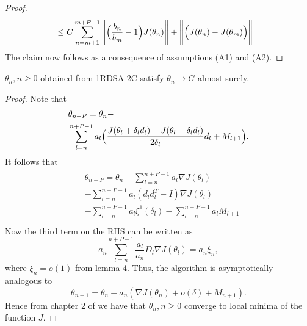 \begin{lemma}
\begin{proof}
\begin{align*}
  &\leq C \sum_{n=m+1}^{m+P-1}\Bigg{\|}\Big{(}\frac{b_n}{b_m}-1\Big{)} J(\theta_n)\Bigg{\|}
  +\Bigg{\|}\Big{(} J(\theta_n)- J(\theta_{m})\Big{)}\Bigg{\|}
\end{align*}
The claim now follows as a consequence of assumptions (A1) and (A2).
\end{proof}
\begin{theorem}
 $\theta_n, n\geq0$ obtained from 1RDSA-2C satisfy $\theta_n \rightarrow G$
 almost surely.
\end{theorem}
\begin{proof}
 Note that
 \begin{align*}
  \begin{split}
  & \theta_{n+P} = \theta_n- \\ 
  &\sum_{l=n}^{n+P-1}a_l\Big{(}\frac{J(\theta_l+\delta_l d_l)-J(\theta_l-\delta_l d_l)}{2\delta_l}d_l+M_{l+1}\Big{)}.
 \end{split}
 \end{align*}
It follows that
 \begin{align*}
  \begin{split}
  & \theta_{n+P} = \theta_n- \sum_{l=n}^{n+P-1}a_l\nabla J(\theta_l)\\ 
  & -\sum_{l=n}^{n+P-1}a_l(d_ld_l^T-I)\nabla J(\theta_l)\\
  & -\sum_{l=n}^{n+P-1}a_l \xi^{1}(\delta_l)-\sum_{l=n}^{n+P-1}a_lM_{l+1}\\
  \end{split}
 \end{align*}
Now the third term on the RHS can be written as
$$a_n\sum_{l=n}^{n+P-1}\frac{a_l}{a_n}D_{l}\nabla J(\theta_l)=a_n\xi_{n},$$
where $\xi_{n}=o(1)$ from lemma 4.
Thus, the algorithm is asymptotically analogous to
$$\theta_{n+1}=\theta_n-a_n(\nabla J(\theta_n)+o(\delta)+M_{n+1}).$$
Hence from chapter 2 of \cite{borkar2008stochastic} we have that $\theta_n, n\geq0$ converge to
local minima of the function $J.$
\end{proof}


\end{lemma}
